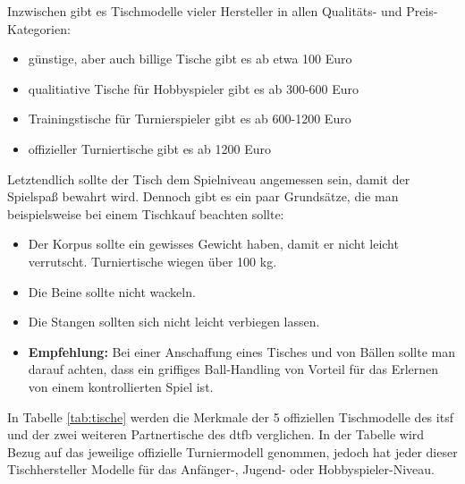 Inzwischen gibt es Tischmodelle vieler Hersteller in allen Qualitäts- und Preis-Kategorien:
\begin{itemize}
\item günstige, aber auch billige Tische gibt es ab etwa 100 Euro 
\item qualitiative Tische für Hobbyspieler gibt es ab 300-600 Euro
\item Trainingstische für Turnierspieler gibt es ab 600-1200 Euro
\item offizieller Turniertische gibt es ab 1200 Euro 
\end{itemize}
Letztendlich sollte der Tisch dem Spielniveau angemessen sein, damit der Spielspaß bewahrt wird. Dennoch gibt es ein paar Grundsätze, die man beispielsweise bei einem Tischkauf beachten sollte:
\begin{itemize}
\item Der Korpus sollte ein gewisses Gewicht haben, damit er nicht leicht verrutscht. Turniertische wiegen über 100 kg.
\item Die Beine sollte nicht wackeln.
\item Die Stangen sollten sich nicht leicht verbiegen lassen.
\item {\bf Empfehlung:} Bei einer Anschaffung eines Tisches und von Bällen sollte man darauf achten, dass ein griffiges Ball-Handling von Vorteil für das Erlernen von einem kontrollierten Spiel ist.
\end{itemize}

In Tabelle \ref{tab:tische} werden die Merkmale der 5 offiziellen Tischmodelle des \gls{itsf} und der zwei weiteren Partnertische des \gls{dtfb} verglichen. In der Tabelle wird Bezug auf das jeweilige offizielle Turniermodell genommen, jedoch hat jeder dieser Tischhersteller Modelle für das Anfänger-, Jugend- oder Hobbyspieler-Niveau.    

